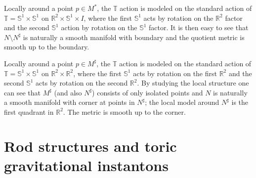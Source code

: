 \documentclass[a4paper,11pt]{amsart}
\theoremstyle{definition}
\numberwithin{equation}{section}
\newcommand{\R}{\mathbb{R}}
\newcommand{\dT}{\mathbb{T}}
\newcommand{\dS}{\mathbb{S}}
\begin{document}
	Locally around a point $p\in M^*$, the $\dT$ action is modeled on the standard action of $\dT=\dS^1\times \dS^1$ on $\R^2\times \dS^1\times I$, where the first $\dS^1$ acts by rotation on the $\R^2$ factor and the second $\dS^1$ action by rotation on the $\dS^1$ factor. It is then easy to see that $N\setminus N^\sharp$ is naturally a smooth manifold with boundary and the quotient metric is  smooth up to the boundary.
	
	Locally around a point $p\in M^\sharp$, the $\dT$ action is modeled on the standard action of $\dT=\dS^1\times \dS^1$ on $\R^2\times \R^2$, where the first $\dS^1$ acts by rotation on the first $\R^2$ and the second $\dS^1$ acts by rotation on the second $\R^2$. By studying the local structure one can see that $M^\sharp$ (and also $N^\sharp$) consists of only isolated points and  $N$ is naturally a smooth manifold with corner at points in $N^\sharp$; the local model around $N^\sharp$ is the first quadrant in $\R^2$. The metric is  smooth up to the corner. 
	




 \section{Rod structures and toric gravitational instantons}\label{sec:rod structures}
\end{document}
